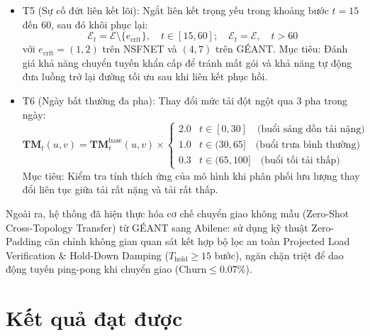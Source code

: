 \documentclass[11pt,a4paper]{article}
\begin{document}
\begin{itemize}[leftmargin=1.5em, itemsep=0.3ex]
    \item T5 (Sự cố đứt liên kết lõi): Ngắt liên kết trọng yếu trong khoảng bước $t = 15$ đến $60$, sau đó khôi phục lại:
    \begin{equation}
        \mathcal{E}_t = \mathcal{E} \setminus \{e_{\text{crit}}\}, \quad t \in [15, 60]; \quad \mathcal{E}_t = \mathcal{E}, \quad t > 60
    \end{equation}
    với $e_{\text{crit}} = (1, 2)$ trên NSFNET và $(4, 7)$ trên GÉANT.
    Mục tiêu: Đánh giá khả năng chuyển tuyến khẩn cấp để tránh mất gói và khả năng tự động đưa luồng trở lại đường tối ưu sau khi liên kết phục hồi.

    \item T6 (Ngày bất thường đa pha): Thay đổi mức tải đột ngột qua 3 pha trong ngày:
    \begin{equation}
        \mathbf{TM}_t(u, v) = \mathbf{TM}_t^{\text{base}}(u, v) \times \begin{cases} 2.0 & t \in [0, 30] \quad \text{(buổi sáng dồn tải nặng)} \\ 1.0 & t \in (30, 65] \quad \text{(buổi trưa bình thường)} \\ 0.3 & t \in (65, 100] \quad \text{(buổi tối tải thấp)} \end{cases}
    \end{equation}
    Mục tiêu: Kiểm tra tính thích ứng của mô hình khi phân phối lưu lượng thay đổi liên tục giữa tải rất nặng và tải rất thấp.
\end{itemize}

Ngoài ra, hệ thống đã hiện thực hóa cơ chế chuyển giao không mẫu (Zero-Shot Cross-Topology Transfer) từ GÉANT sang Abilene: sử dụng kỹ thuật Zero-Padding căn chỉnh không gian quan sát kết hợp bộ lọc an toàn Projected Load Verification \& Hold-Down Damping ($T_{\text{hold}} \ge 15$ bước), ngăn chặn triệt để dao động tuyến ping-pong khi chuyển giao ($\text{Churn} \le 0.07\%$).

\section{Kết quả đạt được}
\end{document}
